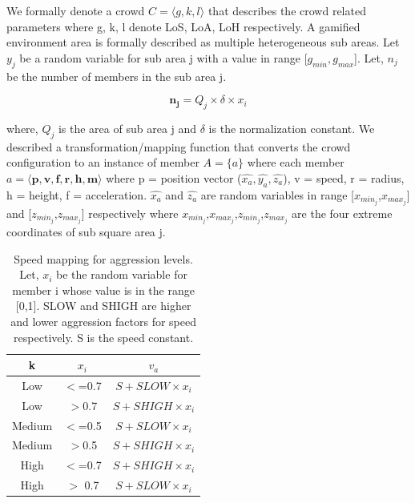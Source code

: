 We formally denote a crowd $C = \langle g, k, l \rangle$ that describes the crowd related parameters where g, k, l denote LoS, LoA, LoH respectively.
A gamified environment area is formally described as multiple heterogeneous sub areas. Let $y_{j}$ be a random variable for sub area j with a value in range [$g_{min},g_{max}$]. Let, $n_{j}$ be the number of members in the sub area j.

\begin{equation}
\mathbf{n_{j}} = Q_{j} \times \delta \times x_{i} 
\end{equation}

where, $Q_{j}$ is the area of sub area j and $\delta$ is the normalization constant.
We described a transformation/mapping function that converts the crowd configuration to an instance of member $A = \{ a \}$ where each member $a = \langle \mathbf{p}, \mathbf{v},\mathbf{f}, \mathbf{r},\mathbf{h},\mathbf{m} \rangle$ where p = position vector ($\hat{x_{a}},\hat{y_{a}},\hat{z_{a}}$), v = speed, r = radius, h = height, f = acceleration. $\hat{x_{a}}$ and $\hat{z_{a}}$ are random variables in range [$x_{min_{j}}$,$x_{max_{j}}$] and [$z_{min_{j}}$,$z_{max_{j}}$] respectively where $x_{min_{j}}$,$x_{max_{j}}$,$z_{min_{j}}$,$z_{max_{j}}$ are the four extreme coordinates of sub square area j.

\begin{table}
\centering
	\begin{tabular}{||c c c ||} 
	\hline
	k & $x_{i}$ & $v_{a}$\\ [0.5ex] 
	\hline\hline
	Low & $<$=0.7 & $S+ SLOW\times x_{i}$ \\ 
	\hline
	Low & $>$0.7 & $S+ SHIGH\times x_{i}$\\
	\hline
	Medium & $<$=0.5 & $S+ SLOW\times x_{i}$ \\
	\hline
	Medium & $>$0.5 & $S+ SHIGH\times x_{i}$\\
	\hline
	High & $<$=0.7 & $S+ SHIGH\times x_{i} $\\
	\hline
	High & $>$ 0.7 & $S+ SLOW\times x_{i}$\\
	\hline
	\end{tabular}
	\caption{\label{table:aggression-levels-speeds} Speed mapping for aggression levels. Let, $x_{i}$ be the random variable for member i whose value is in the range [0,1]. SLOW and SHIGH are higher and lower aggression factors for speed respectively. S is the speed constant.}
\end{table}

